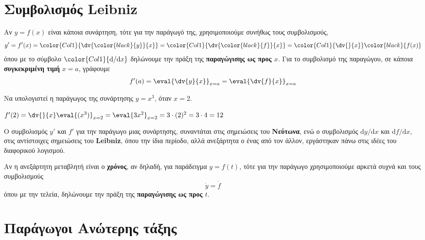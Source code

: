   \section*{Συμβολισμός Leibniz}

  Αν $ y= f(x) $ είναι κάποια συνάρτηση, τότε για την παράγωγό της, χρησιμοποιούμε 
  συνήθως τους συμβολισμούς,
  \[
    y' = f'(x) = \color{Col1}{\dv{\color{black}{y}}{x}} =
    \color{Col1}{\dv{\color{black}{f}}{x}} =
    \color{Col1}{\dv{}{x}} \color{black}{f (x)} 
  \] 
  όπου με το σύμβολο $\color{Col1}{\mathrm{d}/\mathrm{d}x}$ δηλώνουμε την πράξη της 
  \textbf{παραγώγισης ως προς $x$}. Για το συμβολισμό της παραγώγου, σε κάποια 
  \textbf{συγκεκριμένη τιμή} $ x= a $, γράφουμε
  \[
    f'(a) = \eval{\dv{y}{x}}_{x= a} = \eval{\dv{f}{x}}_{x=a} 
  \] 
  \begin{example}
    Να υπολογιστεί η παράγωγος της συνάρτησης $ y= x^{3} $, όταν $ x=2 $.
  \end{example}
  \begin{solution}
    $ f'(2) = \dv{}{x}\eval{(x^{3})}_{x=2} = \eval{3x^{2}}_{x=2} = 3\cdot (2)^{2} = 3\cdot
    4 = 12 $
  \end{solution}
  \begin{rem}
    Ο συμβολισμός $ y' $ και $ f' $ για την παράγωγο μιας συνάρτησης, συναντάται στις
    σημειώσεις του \textbf{Νεύτωνα}, ενώ ο συμβολισμός $ \mathrm{d}y/\mathrm{d}x $ και 
    $ \mathrm{d}f/\mathrm{d}x $, στις αντίστοιχες σημειώσεις του \textbf{Leibniz}, όπου 
    την ίδια περίοδο, αλλά ανεξάρτητα ο ένας από τον άλλον, εργάστηκαν πάνω στις ιδέες του 
    διαφορικού λογισμού.
  \end{rem}
  \begin{rem}
    Αν η ανεξάρτητη μεταβλητή είναι ο \textbf{χρόνος}, αν δηλαδή, για παράδειγμα 
    $ y=f(t) $, τότε για την παράγωγο χρησιμοποιούμε αρκετά συχνά και τους συμβολισμούς
    \[
      \dot y = \dot f
    \] 
    όπου με την τελεία, δηλώνουμε την πράξη της \textbf{παραγώγισης ως προς $t$}. 
  \end{rem}


  \section*{Παράγωγοι Ανώτερης τάξης}

